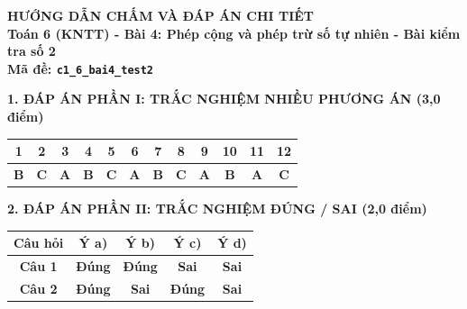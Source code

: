 \documentclass[11pt,a4paper]{article}
\begin{document}
\newpage
\begin{center}
{\Large\bfseries HƯỚNG DẪN CHẤM VÀ ĐÁP ÁN CHI TIẾT}\\[4pt]
{\large\bfseries Toán 6 (KNTT) - Bài 4: Phép cộng và phép trừ số tự nhiên - Bài kiểm tra số 2}\\[2pt]
{\bfseries Mã đề: \texttt{c1\_6\_bai4\_test2}}
\end{center}

\vspace{10pt}
\noindent\textbf{\large 1. ĐÁP ÁN PHẦN I: TRẮC NGHIỆM NHIỀU PHƯƠNG ÁN (3,0 điểm)}
\vspace{4pt}
\begin{center}
\begin{tabular}{|c|c|c|c|c|c|c|c|c|c|c|c|}
\hline
\textbf{1} & \textbf{2} & \textbf{3} & \textbf{4} & \textbf{5} & \textbf{6} & \textbf{7} & \textbf{8} & \textbf{9} & \textbf{10} & \textbf{11} & \textbf{12} \\
\hline
\textbf{B} & \textbf{C} & \textbf{A} & \textbf{B} & \textbf{C} & \textbf{A} & \textbf{B} & \textbf{C} & \textbf{A} & \textbf{B} & \textbf{A} & \textbf{C} \\
\hline
\end{tabular}
\end{center}
\vspace{6pt}


\noindent\textbf{\large 2. ĐÁP ÁN PHẦN II: TRẮC NGHIỆM ĐÚNG / SAI (2,0 điểm)}
\vspace{4pt}
\begin{center}
\begin{tabular}{|c|c|c|c|c|}
\hline
\textbf{Câu hỏi} & \textbf{Ý a)} & \textbf{Ý b)} & \textbf{Ý c)} & \textbf{Ý d)} \\
\hline
\textbf{Câu 1} & \textbf{Đúng} & \textbf{Đúng} & \textbf{Sai} & \textbf{Sai} \\
\hline
\textbf{Câu 2} & \textbf{Đúng} & \textbf{Sai} & \textbf{Đúng} & \textbf{Sai} \\
\hline
\end{tabular}
\end{center}
\vspace{6pt}
\end{document}
